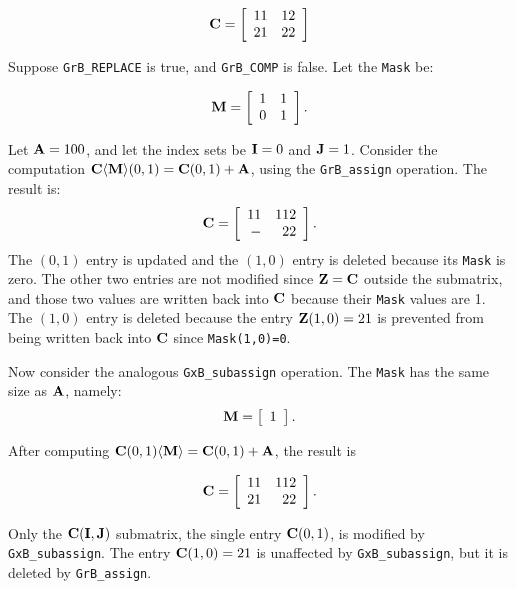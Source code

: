 \documentclass[12pt]{article}
\begin{document}
{\[
{\bf C} = \left[
    \begin{array}{rr}
    11 & 12 \\
    21 & 22 \\
    \end{array}
    \right]
\]

Suppose \verb'GrB_REPLACE' is true, and \verb'GrB_COMP' is false.  Let the
\verb'Mask' be:

\[
{\bf M} = \left[
    \begin{array}{rr}
    1 & 1 \\
    0 & 1 \\
    \end{array}
    \right].
\]

Let ${\bf A} = 100$, and let the index sets be ${\bf I}=0$ and ${\bf J}=1$.
Consider the computation
${\bf C \langle M \rangle} (0,1) = {\bf C}(0,1) + {\bf A}$,
using the \verb'GrB_assign' operation.  The result is:
\[
{\bf C} = \left[
    \begin{array}{rr}
    11 & 112 \\
     - &  22 \\
    \end{array}
    \right].
\]
The $(0,1)$ entry is updated and the $(1,0)$ entry is deleted because
its \verb'Mask' is zero.  The other two entries are not modified since ${\bf Z}
= {\bf C}$ outside the submatrix, and those two values are written back into
${\bf C}$ because their \verb'Mask' values are 1.  The $(1,0)$ entry is deleted
because the entry ${\bf Z}(1,0)=21$ is prevented from being written back into
${\bf C}$ since \verb'Mask(1,0)=0'.

Now consider the analogous \verb'GxB_subassign' operation.  The \verb'Mask' has
the same size as ${\bf A}$, namely:
\[
{\bf M} = \left[
    \begin{array}{r}
    1 \\
    \end{array}
    \right].
\]

After computing
${\bf C} (0,1) {\bf \langle M \rangle} = {\bf C}(0,1) + {\bf A}$,
the result is

\[
{\bf C} = \left[
    \begin{array}{rr}
    11 & 112 \\
    21 &  22 \\
    \end{array}
    \right].
\]

Only the ${\bf C(I,J)}$ submatrix, the single entry ${\bf C}(0,1)$, is modified
by \verb'GxB_subassign'.  The entry ${\bf C}(1,0)=21$ is unaffected by
\verb'GxB_subassign', but it is deleted by \verb'GrB_assign'.

}
\end{document}
